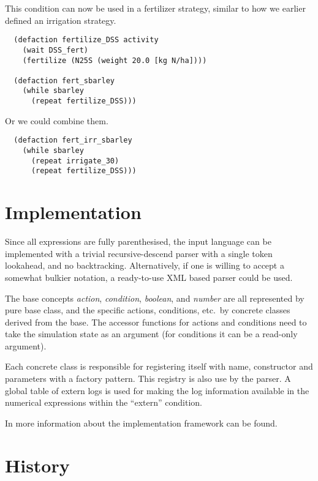 \documentclass[a4paper]{article}
\begin{document}
This condition can now be used in a fertilizer strategy, similar to
how we earlier defined an irrigation strategy.
\begin{verbatim}
  (defaction fertilize_DSS activity 
    (wait DSS_fert)
    (fertilize (N25S (weight 20.0 [kg N/ha])))

  (defaction fert_sbarley
    (while sbarley
      (repeat fertilize_DSS)))
\end{verbatim}
Or we could combine them.
\begin{verbatim}
  (defaction fert_irr_sbarley
    (while sbarley
      (repeat irrigate_30)
      (repeat fertilize_DSS)))
\end{verbatim}

\section{Implementation}

Since all expressions are fully parenthesised, the input language can
be implemented with a trivial recursive-descend parser with a single
token lookahead, and no backtracking.  Alternatively, if one is
willing to accept a somewhat bulkier notation, a ready-to-use XML
based parser could be used.

The base concepts \emph{action}, \emph{condition}, \emph{boolean}, and
\emph{number} are all represented by pure base class, and the specific
actions, conditions, etc.\ by concrete classes derived from the base.
The accessor functions for actions and conditions need to take the
simulation state as an argument (for conditions it can be a read-only
argument).

Each concrete class is responsible for registering itself with name,
constructor and parameters with a factory pattern.  This registry is
also use by the parser.  A global table of extern logs is used for
making the log information available in the numerical expressions
within the ``extern'' condition.

In \cite{daisy-ems} more information about the implementation
framework can be found.

\section{History}
\end{document}
